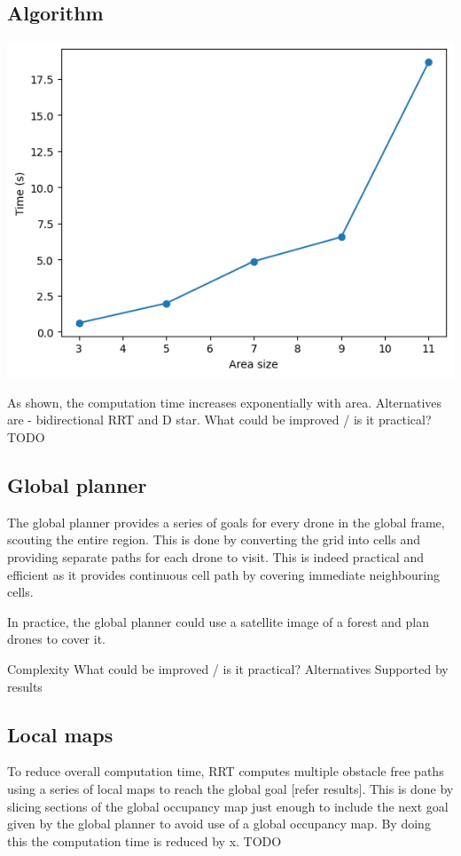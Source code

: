 \subsection{Algorithm}

\includegraphics[scale=0.5]{images/time_area.png}

As shown, the computation time increases exponentially with area.
Alternatives are - bidirectional RRT and D star.
What could be improved / is it practical? TODO
 
\subsection{Global planner}

The global planner provides a series of goals for every drone in the global frame, scouting the entire region. This is done by converting the grid into cells and providing separate paths for each drone to visit. This is indeed practical and efficient as it provides continuous cell path by covering immediate neighbouring cells.

In practice, the global planner could use a satellite image of a forest and plan drones to cover it. 

Complexity
What could be improved / is it practical?
Alternatives
Supported by results

\subsection{Local maps}

To reduce overall computation time, RRT computes multiple obstacle free paths
using a series of local maps to reach the global goal [refer results]. This is done by slicing sections of the global occupancy map just enough to include the next goal given by the global planner to avoid use of a global occupancy map. By doing this the computation time is reduced by x. TODO \\ 


